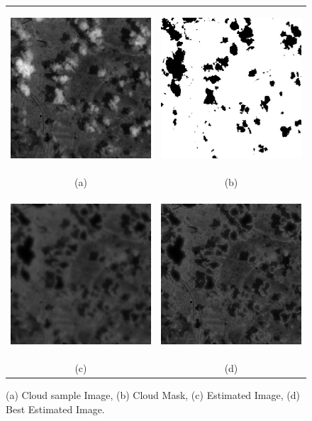 \documentclass[a4paper, 15pt]{article}
\begin{document}
	\begin{figure}[!h]
		\centering
		\begin{tabular}{cc}
			\includegraphics[width=6cm, height=6cm]{cloudSample.png} &\hspace{-8pt}
			\includegraphics[width=6cm, height=6cm]{cloudMask2.jpg}\\
			(a) & (b) \\ 
			\includegraphics[width=6cm, height=6cm]{CloudInpainted_OrigGMRF.png} &\hspace{-8pt}
			\includegraphics[width=6cm, height=6cm]{CloudInpaintedGMRF.png}\\
			(c) & (d)
		\end{tabular}
		\caption{(a) Cloud sample Image, (b) Cloud Mask, (c) Estimated Image, (d) Best Estimated Image.}
	\end{figure}
\end{document}

